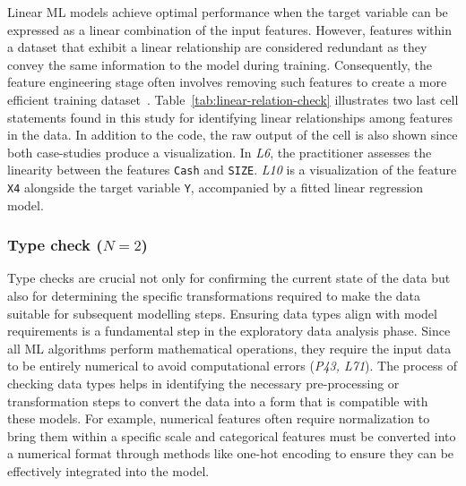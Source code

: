 Linear ML models achieve optimal performance when the target variable can be expressed as a linear combination of the input features. However, features within a dataset that exhibit a linear relationship are considered redundant as they convey the same information to the model during training. Consequently, the feature engineering stage often involves removing such features to create a more efficient training dataset~\cite{shome2022data}. Table~\ref{tab:linear-relation-check} illustrates two last cell statements found in this study for identifying linear relationships among features in the data. In addition to the code, the raw output of the cell is also shown since both case-studies produce a visualization.  In \emph{L6}, the practitioner assesses the linearity between the features \texttt{Cash} and \texttt{SIZE}. \emph{L10} is a visualization of the feature \texttt{X4} alongside the target variable \texttt{Y}, accompanied by a fitted linear regression model.


\subsubsection{Type check ($N = 2$)}

Type checks are crucial not only for confirming the current state of the data but also for determining the specific transformations required to make the data suitable for subsequent modelling steps. Ensuring data types align with model requirements is a fundamental step in the exploratory data analysis phase. Since all ML algorithms perform mathematical operations, they require the input data to be entirely numerical to avoid computational errors (\emph{P43, L71}). The process of checking data types helps in identifying the necessary pre-processing or transformation steps to convert the data into a form that is compatible with these models. For example, numerical features often require normalization to bring them within a specific scale and categorical features must be converted into a numerical format through methods like one-hot encoding to ensure they can be effectively integrated into the model.

